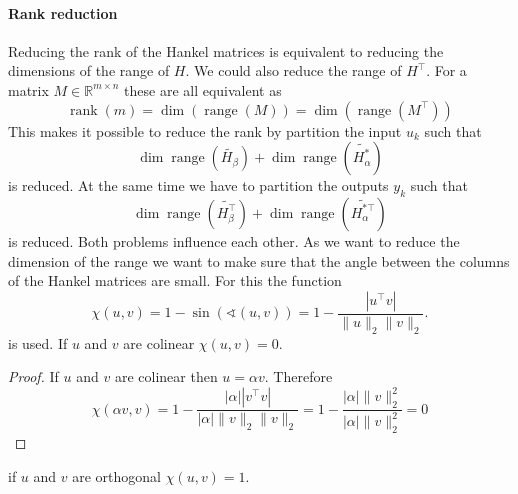 \documentclass[doctype=mastersthesis,BCOR=15mm,biblatex]{ldvbook}%
\DeclareMathOperator{\rank}{rank}
\DeclareMathOperator{\range}{range}
\begin{document}
\paragraph{Rank reduction}
Reducing the rank of the Hankel matrices is equivalent to reducing the dimensions of the range of $H$.
We could also reduce the range of $H^\top$.
For a matrix $M\in \mathbb{R}^{m\times n}$ these are all equivalent as 
\begin{equation}
\rank(m) = \dim(\range(M)) = \dim(\range(M^\top))
\end{equation}
This makes it possible to reduce the rank by partition the input $u_k$ such that 
\begin{equation}
\dim\range(\tilde{H_\beta}) + \dim\range(\tilde{H_\alpha^*})
\end{equation}
is reduced. At the same time we have to partition the outputs $y_k$ such that 
\begin{equation}
\dim\range(\tilde{H^\top_\beta}) + \dim\range(\tilde{H_\alpha^{*\top}})
\end{equation}
is reduced.
Both problems influence each other.
As we want to reduce the dimension of the range we want to make sure that the angle between the columns of the Hankel matrices are small. %
For this the function 
\begin{equation}
\chi(u,v) =  1-\sin(\sphericalangle(u,v)) =1-\frac{|u^\top v|}{\|u\|_2\|v\|_2}
.
\end{equation}
is used.
If $u$ and $v$ are colinear $\chi(u,v) = 0$.
\begin{proof}
	If $u$ and $v$ are colinear then $u = \alpha v$. Therefore
	\begin{equation}
	\chi(\alpha v,v) = 1-\frac{|\alpha| |v^\top v|}{|\alpha|\|v\|_2\|v\|_2}= 1-\frac{|\alpha| \|v\|_2^2}{|\alpha| \|v\|_2^2} = 0
	\end{equation}
\end{proof}
if $u$ and $v$ are orthogonal $\chi(u,v) = 1$.
\end{document}
